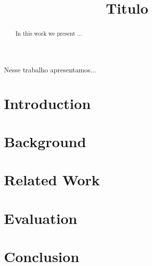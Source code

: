 \documentclass[mestrado]{pacotes/unb-cic}
\title{Titulo}
\begin{document}
\maketitle

\pretextual
\begin{agradecimentos}
\end{agradecimentos}

\begin{resumo}
Nesse trabalho apresentamos...

\end{resumo}


\begin{abstract}\textbf{}

In this work we present ...

\end{abstract}

\tableofcontents
\listoffigures

\textual

\chapter{Introduction}




\chapter{Background}








\chapter{Related Work}





%

%
\chapter{Evaluation}

\chapter{Conclusion}


\postextual
\anexos 




\end{document}
